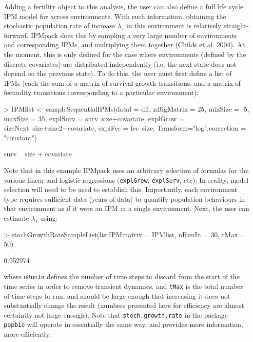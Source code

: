 \documentclass{article}
\begin{document}
Adding a fertility object to this analysis, the user can also define a full life
cycle IPM model for across environments. With such information, obtaining the stochastic population rate of increase $\lambda_s$ in this environment is relatively straight-forward. IPMpack does this by sampling a very large number of environments and corresponding IPMs, and multiplying them together (Childs et al. $2004$). At the moment, this is only defined for the case where environments (defined by the discrete covariates) are distributed independently (i.e. the next state does not depend on the previous state). To do this, the user must first define a list of IPMs (each the sum of a matrix of survival-growth transitions, and a matrix of fecundity transitions corresponding to a particular environment):
\begin{Schunk}
\begin{Sinput}
> IPMlist <- sampleSequentialIPMs(dataf = dff, nBigMatrix = 25, minSize = -5, 
                          maxSize = 35, explSurv = surv~size+covariate, 
                          explGrow = sizeNext~size+size2+covariate, 
                          explFec = fec~size, Transform="log",correction = "constant")
\end{Sinput}
\begin{Soutput}
surv ~ size + covariate
\end{Soutput}
\end{Schunk}
Note that in this example IPMpack uses an arbitrary selection of
formulas for the various linear and logistic
regressions ({\tt explGrow}, {\tt explSurv}, etc). In reality,
model selection will need to be used to establish this. Importantly, each
environment type requires sufficient data (years of data) to quantify population
behaviours in that environment as if it were an IPM in a single environment.  
Next, the user can estimate $\lambda_s$ using:
\begin{Schunk}
\begin{Sinput}
> stochGrowthRateSampleList(listIPMmatrix = IPMlist, 
                            nRunIn = 30, tMax = 50)
\end{Sinput}
\begin{Soutput}
[1] 0.952974
\end{Soutput}
\end{Schunk}
where {\tt nRunIn} defines the number of time steps to discard from the start of the time series in order to remove transient dynamics, and {\tt tMax} is the total
number of time steps to run, and should be large enough that increasing it does not substantially change the result (numbers presented here for efficiency are almost certaintly not large enough). Note that {\tt stoch.growth.rate} in the package {\tt popbio} will operate in essentially the same way, and provides more information, more efficiently.  
\end{document}
